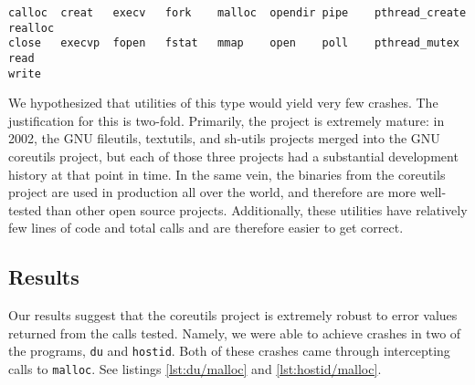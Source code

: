 \begin{lstlisting}[label={lst:coreutils_wrappers},caption={Wrapped calls for testing Command-line Utilities}]
calloc  creat   execv   fork    malloc  opendir pipe    pthread_create 	realloc
close   execvp  fopen   fstat   mmap    open    poll    pthread_mutex	read    
write
\end{lstlisting}

We hypothesized that utilities of this type would yield very few crashes. The justification for this is two-fold. Primarily, the project is extremely mature: in 2002, the GNU fileutils, textutils, and sh-utils projects merged into the GNU coreutils project, but each of those three projects had a substantial development history at that point in time. In the same vein, the binaries from the coreutils project are used in production all over the world, and therefore are more well-tested than other open source projects. Additionally, these utilities have relatively few lines of code and total calls and are therefore easier to get correct.

\subsection{Results}
Our results suggest that the coreutils project is extremely robust to error values returned from the calls tested. Namely, we were able to achieve crashes in two of the programs, \texttt{du} and \texttt{hostid}. Both of these crashes came through intercepting calls to \texttt{malloc}. See listings \ref{lst:du/malloc} and \ref{lst:hostid/malloc}.
